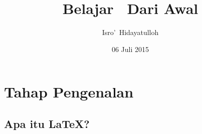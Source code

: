 \documentclass[12pt]{book}
\title{Belajar \LaTeXe\ Dari Awal}
\author{Isro\rq\ Hidayatulloh}
\date{06 Juli 2015}
\begin{document}
\renewcommand{\contentsname}{Daftar Isi}
\renewcommand{\chaptername}{BAB}
\renewcommand{\figurename}{Gambar}
\renewcommand{\tablename}{Tabel}
\renewcommand{\bibname}{Daftar Pustaka}
\renewcommand{\listtablename}{Daftar Tabel}
\renewcommand{\listfigurename}{Daftar Gambar}
\setcounter{secnumdepth}{3}
\maketitle
\newpage

\chapter{Tahap Pengenalan}

\section{Apa itu \LaTeX?}
\end{document}
